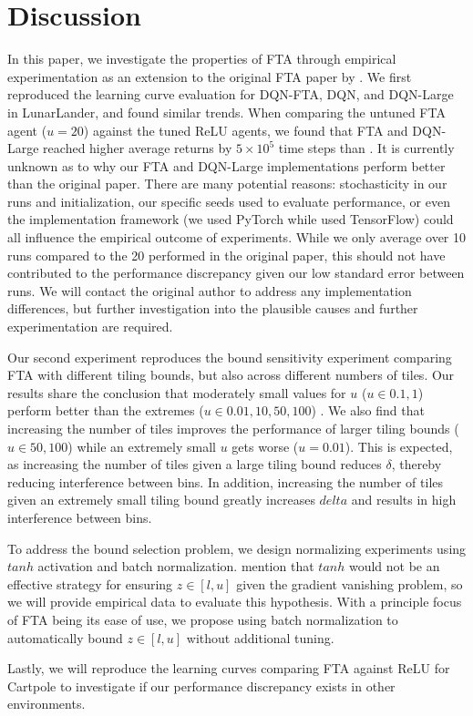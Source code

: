 \documentclass{article}
\begin{document}
\section{Discussion} \label{sec:discussion}
In this paper, we investigate the properties of FTA through empirical experimentation as an extension to the original FTA paper by \cite[]{pan2019fuzzy}.
We first reproduced the learning curve evaluation for DQN-FTA, DQN, and DQN-Large in LunarLander, and found similar trends.
When comparing the untuned FTA agent ($u = 20$) against the tuned ReLU agents, we found that FTA and DQN-Large reached higher average returns
by $5\times10^5$ time steps than \cite{pan2019fuzzy}. It is currently unknown as to why our FTA and DQN-Large implementations perform better than the original paper.
There are many potential reasons: stochasticity in our runs and initialization, our specific seeds used to evaluate performance, or even the implementation framework
(we used PyTorch while \cite{pan2019fuzzy} used TensorFlow) could all influence the empirical outcome of experiments.
While we only average over 10 runs compared to the 20 performed in the original paper, this should not have contributed to the performance discrepancy
given our low standard error between runs. We will contact the original author to address any implementation differences,
but further investigation into the plausible causes and further experimentation are required.

Our second experiment reproduces the bound sensitivity experiment comparing FTA with different tiling bounds,
but also across different numbers of tiles. Our results share the conclusion that moderately small values for $u$ ($u \in {0.1, 1}$)
perform better than the extremes ($u \in {0.01, 10, 50, 100}$) \cite[]{pan2019fuzzy}. We also find that increasing the number of tiles
improves the performance of larger tiling bounds ($u \in {50, 100}$) while an extremely small $u$ gets worse ($u = 0.01$). This is expected,
as increasing the number of tiles given a large tiling bound reduces $\delta$, thereby reducing interference between bins. In addition,
increasing the number of tiles given an extremely small tiling bound greatly increases $delta$ and results in high interference between bins.

To address the bound selection problem, we design normalizing experiments using $tanh$ activation and batch normalization.
\cite{pan2019fuzzy} mention that $tanh$ would not be an effective strategy for ensuring $z \in [l,u]$ given the gradient vanishing problem,
so we will provide empirical data to evaluate this hypothesis. With a principle focus of FTA being its ease of use,
we propose using batch normalization to automatically bound $z \in [l,u]$ without additional tuning.

Lastly, we will reproduce the learning curves comparing FTA against ReLU for Cartpole to investigate if our performance discrepancy exists in other environments.


\newpage

\end{document}
